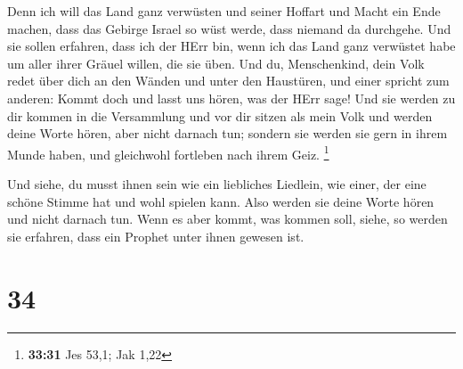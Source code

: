  Denn ich will das Land ganz verwüsten und seiner Hoffart
und Macht ein Ende machen, dass das Gebirge Israel so wüst werde, dass
niemand da durchgehe.  Und sie sollen erfahren, dass ich
der HErr bin, wenn ich das Land ganz verwüstet habe um aller ihrer
Gräuel willen, die sie üben.  Und du, Menschenkind, dein
Volk redet über dich an den Wänden und unter den Haustüren, und einer
spricht zum anderen: Kommt doch und lasst uns hören, was der HErr sage!
 Und sie werden zu dir kommen in die Versammlung und vor
dir sitzen als mein Volk und werden deine Worte hören, aber nicht
darnach tun; sondern sie werden sie gern in ihrem Munde haben, und
gleichwohl fortleben nach ihrem Geiz. \footnote{\textbf{33:31} Jes 53,1;
  Jak 1,22}

 Und siehe, du musst ihnen sein wie ein liebliches
Liedlein, wie einer, der eine schöne Stimme hat und wohl spielen kann.
Also werden sie deine Worte hören und nicht darnach tun. 
Wenn es aber kommt, was kommen soll, siehe, so werden sie erfahren, dass
ein Prophet unter ihnen gewesen ist.

\hypertarget{section-33}{%
\section{34}\label{section-33}}

